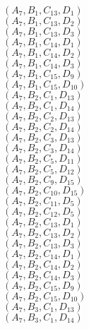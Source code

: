 \documentclass[14pt]{article}
\begin{document}
    $({A}_{7}, {B}_{1}, {C}_{13}, {D}_{1}) $ \\ 
    $({A}_{7}, {B}_{1}, {C}_{13}, {D}_{2}) $ \\ 
    $({A}_{7}, {B}_{1}, {C}_{13}, {D}_{3}) $ \\ 
    $({A}_{7}, {B}_{1}, {C}_{14}, {D}_{1}) $ \\ 
    $({A}_{7}, {B}_{1}, {C}_{14}, {D}_{2}) $ \\ 
    $({A}_{7}, {B}_{1}, {C}_{14}, {D}_{3}) $ \\ 
    $({A}_{7}, {B}_{1}, {C}_{15}, {D}_{9}) $ \\ 
    $({A}_{7}, {B}_{1}, {C}_{15}, {D}_{10}) $ \\ 
    $({A}_{7}, {B}_{2}, {C}_{1}, {D}_{13}) $ \\ 
    $({A}_{7}, {B}_{2}, {C}_{1}, {D}_{14}) $ \\ 
    $({A}_{7}, {B}_{2}, {C}_{2}, {D}_{13}) $ \\ 
    $({A}_{7}, {B}_{2}, {C}_{2}, {D}_{14}) $ \\ 
    $({A}_{7}, {B}_{2}, {C}_{3}, {D}_{13}) $ \\ 
    $({A}_{7}, {B}_{2}, {C}_{3}, {D}_{14}) $ \\ 
    $({A}_{7}, {B}_{2}, {C}_{5}, {D}_{11}) $ \\ 
    $({A}_{7}, {B}_{2}, {C}_{5}, {D}_{12}) $ \\ 
    $({A}_{7}, {B}_{2}, {C}_{9}, {D}_{15}) $ \\ 
    $({A}_{7}, {B}_{2}, {C}_{10}, {D}_{15}) $ \\ 
    $({A}_{7}, {B}_{2}, {C}_{11}, {D}_{5}) $ \\ 
    $({A}_{7}, {B}_{2}, {C}_{12}, {D}_{5}) $ \\ 
    $({A}_{7}, {B}_{2}, {C}_{13}, {D}_{1}) $ \\ 
    $({A}_{7}, {B}_{2}, {C}_{13}, {D}_{2}) $ \\ 
    $({A}_{7}, {B}_{2}, {C}_{13}, {D}_{3}) $ \\ 
    $({A}_{7}, {B}_{2}, {C}_{14}, {D}_{1}) $ \\ 
    $({A}_{7}, {B}_{2}, {C}_{14}, {D}_{2}) $ \\ 
    $({A}_{7}, {B}_{2}, {C}_{14}, {D}_{3}) $ \\ 
    $({A}_{7}, {B}_{2}, {C}_{15}, {D}_{9}) $ \\ 
    $({A}_{7}, {B}_{2}, {C}_{15}, {D}_{10}) $ \\ 
    $({A}_{7}, {B}_{3}, {C}_{1}, {D}_{13}) $ \\ 
    $({A}_{7}, {B}_{3}, {C}_{1}, {D}_{14}) $ \\ 
\end{document}
